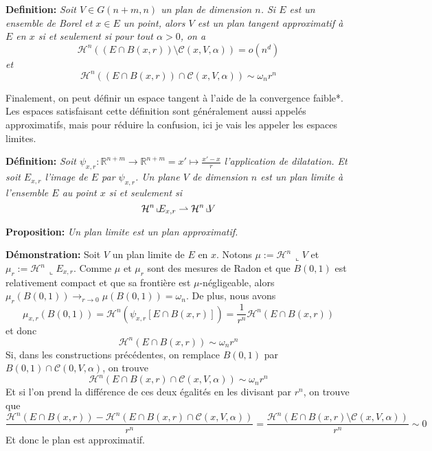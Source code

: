 \documentclass{article}
\begin{document}
\vspace{1ex}
\textbf{Definition:} \textit{Soit $V\in G(n+m,n)$ un plan de dimension $n$. Si 
$E$ est un ensemble de Borel et $x\in E$ un point, alors $V$ est un plan tangent
approximatif à $E$ en $x$ si et seulement si pour tout $\alpha>0$, on a
\[\mathcal H^n((E∩B(x,r))\setminus\mathcal C(x, V, \alpha)) = o(n^d)\]
et
\[\mathcal H^n((E∩B(x, r))∩\mathcal C(x, V, α))\sim \omega_nr^n\]
}

\vspace{2ex}
Finalement, on peut définir un espace tangent à l'aide de la convergence faible*.
Les espaces satisfaisant cette définition sont généralement aussi appelés
approximatifs, mais pour réduire la confusion, ici je vais les appeler les
espaces limites.

\vspace{1ex}
\textbf{Définition:} 
\textit{Soit $\psi_{x,r}:\mathbb R^{n+m}\rightarrow \mathbb R^{n+m}=x'\mapsto
\frac{x'-x}{r}$ l'application de dilatation. Et soit $E_{x,r}$ l'image de $E$
par $\psi_{x,r}$.  Un plane $V$ de dimension $n$ est un plan limite à
l'ensemble $E$ au point $x$ si et seulement si
\[\mathcal H^n\,\llcorner\hspace{-1mm}E_{x,r}\rightharpoonup\mathcal H^n\,\llcorner\hspace{-1mm}V\] 
}

\vspace{2ex}
\textbf{Proposition:} \textit{Un plan limite est un plan approximatif.}

\vspace{1ex}
\textbf{Démonstration:} Soit $V$ un plan limite de $E$ en $x$. Notons $\mu:=
\mathcal{H}^n\,\llcorner V$ et $\mu_r:=\mathcal{H}^n\,\llcorner E_{x,r}$. Comme
$\mu$ et $\mu_r$ sont des mesures de Radon et que $B(0,1)$ est relativement
compact et que sa frontière est $\mu$-négligeable, alors $\mu_r(B(0,1))
\rightarrow_{r\rightarrow 0} \mu(B(0,1)) = \omega_n$.
De plus, nous avons
\[\mu_{x,r}(B(0,1)) = \mathcal{H}^n(\psi_{x,r}[E\cap B(x, r)]) = \frac{1}{r^n}
\mathcal{H}^n(E\cap B(x, r))\]
et donc
\[\mathcal{H}^n(E\cap B(x, r)) \sim \omega_n r^n\]
Si, dans les constructions précédentes, on remplace $B(0,1)$ par $B(0,1)\cap
\mathcal{C}(0,V,\alpha)$, on trouve
\[\mathcal{H}^n(E\cap B(x, r)\cap\mathcal{C}(x,V,\alpha)) \sim \omega_n r^n\]
Et si l'on prend la différence de ces deux égalités en les divisant par $r^n$,
on trouve que
\[\frac{\mathcal{H}^n(E\cap B(x, r)) - \mathcal{H}^n(E\cap B(x, r)\cap\mathcal{C}(x,V,\alpha))}{r^n} = \frac{\mathcal{H}^n(E\cap B(x, r)\setminus\mathcal{C}(x,V,\alpha))}{r^n} \sim 0\]
Et donc le plan est approximatif.
\end{document}

